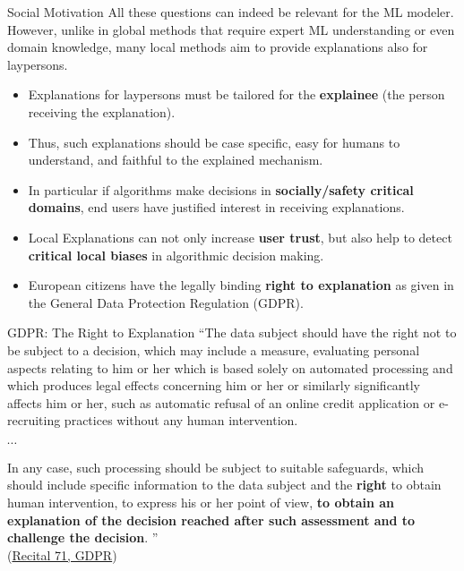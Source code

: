 \documentclass[11pt,compress,t,notes=noshow, aspectratio=169, xcolor=table]{beamer}
\begin{document}
\begin{vbframe}{Social Motivation}
All these questions can indeed be relevant for the ML modeler. However, unlike in global methods that require expert ML understanding or even domain knowledge, many local methods aim to provide explanations also for laypersons. 
	\begin{itemize}
		\item Explanations for laypersons must be tailored for the \textbf{explainee} (the person receiving the explanation).
		\item Thus, such explanations should be case specific, easy for humans to understand, and faithful to the explained mechanism.
		\item In particular if algorithms make decisions in \textbf{socially/safety critical domains}, end users have justified interest in receiving explanations.
		\item Local Explanations can not only increase \textbf{user trust}, but also help to detect \textbf{critical local biases} in algorithmic decision making.
		\item European citizens have the legally binding \textbf{right to explanation} as given in the General Data Protection Regulation (GDPR).

	\end{itemize}
\end{vbframe}


\begin{vbframe}{GDPR: The Right to Explanation}
    ``The data subject should have the right not to be subject to a decision, which may include a measure, evaluating personal aspects relating to him or her which is based solely on automated processing and which produces legal effects concerning him or her or similarly significantly affects him or her, such as automatic refusal of an online credit application or e-recruiting practices without any human intervention.

$\cdots$

In any case, such processing should be subject to suitable safeguards, which should include specific information to the data subject and the \textbf{right} to obtain human intervention, to express his or her point of view, \textbf{to obtain an explanation of the decision reached after such assessment and to challenge the decision}.
'' \\[0.2cm] (\href{https://gdpr-text.com/read/recital-71/}{Recital 71, GDPR})
\end{vbframe}
\end{document}
